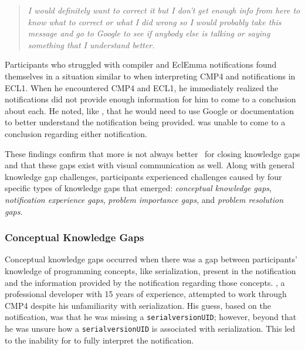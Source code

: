 \vspace{0.5em}
\begin{quote}
	\textit{I would definitely want to correct it but I don't get enough info from here to know what to correct or what I did wrong so I would probably take this message and go to Google to see if anybody else is talking or saying something that I understand better.}
\end{quote}

\noindent
Participants who struggled with compiler and EclEmma notifications found themselves in a situation similar to  when interpreting CMP4 and notifications in ECL1. When he encountered CMP4 and ECL1, he immediately realized the notifications did not provide enough information for him to come to a conclusion about each. He noted, like , that he would need to use Google or documentation to better understand the notification being provided.  was unable to come to a conclusion regarding either notification.

These findings confirm that more is not always better~\cite{Nienaltowski:2008:Compiler} for closing knowledge gaps and that these gaps exist with visual communication as well.
Along with general knowledge gap challenges, participants experienced challenges caused by four specific types of knowledge gaps that emerged: \textit{conceptual knowledge gaps}, \textit{notification experience gaps}, \textit{problem importance gaps}, and \textit{problem resolution gaps}.

\subsubsection{Conceptual Knowledge Gaps}\label{subsec:concept}
Conceptual knowledge gaps occurred when there was a gap between participants' knowledge of programming concepts, 
like serialization, present in the notification and the information provided by the notification regarding those concepts. 
, a professional developer with 15 years of experience, attempted to work through 
CMP4 despite his unfamiliarity with serialization. 
His guess, based on the notification, was that he was missing a \texttt{serialversionUID}; 
however, beyond that he was unsure how a \texttt{serialversionUID} is associated with serialization. 
This led to the inability for  to fully interpret the notification.

